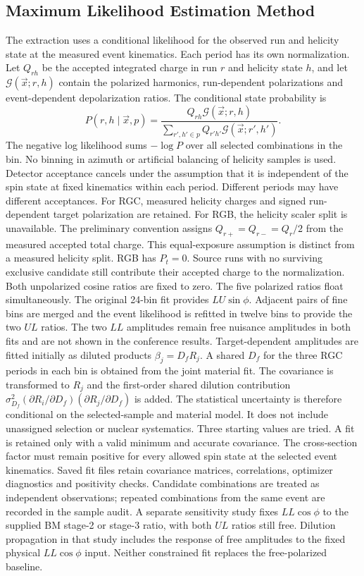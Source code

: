\subsection{Maximum Likelihood Estimation Method}\label{sec:MLE}
The extraction uses a conditional likelihood for the observed run and helicity state at the measured event kinematics. Each period has its own normalization. Let $Q_{rh}$ be the accepted integrated charge in run $r$ and helicity state $h$, and let $\mathcal G(\vec x;r,h)$ contain the polarized harmonics, run-dependent polarizations and event-dependent depolarization ratios. The conditional state probability is
\begin{equation}
 P(r,h\mid\vec x,p)=\frac{Q_{rh}\mathcal G(\vec x;r,h)}{\sum_{r',h'\in p}Q_{r'h'}\mathcal G(\vec x;r',h')}.
\end{equation}
The negative log likelihood sums $-\log P$ over all selected combinations in the bin. No binning in azimuth or artificial balancing of helicity samples is used. Detector acceptance cancels under the assumption that it is independent of the spin state at fixed kinematics within each period. Different periods may have different acceptances.
For RGC, measured helicity charges and signed run-dependent target polarization are retained. For RGB, the helicity scaler split is unavailable. The preliminary convention assigns $Q_{r+}=Q_{r-}=Q_r/2$ from the measured accepted total charge. This equal-exposure assumption is distinct from a measured helicity split. RGB has $P_t=0$. Source runs with no surviving exclusive candidate still contribute their accepted charge to the normalization.
Both unpolarized cosine ratios are fixed to zero. The five polarized ratios float simultaneously. The original 24-bin fit provides $LU\sin\phi$. Adjacent pairs of fine bins are merged and the event likelihood is refitted in twelve bins to provide the two $UL$ ratios. The two $LL$ amplitudes remain free nuisance amplitudes in both fits and are not shown in the conference results.
Target-dependent amplitudes are fitted initially as diluted products $\beta_j=D_f R_j$. A shared $D_f$ for the three RGC periods in each bin is obtained from the joint material fit. The covariance is transformed to $R_j$ and the first-order shared dilution contribution $\sigma_{D_f}^2(\partial R_i/\partial D_f)(\partial R_j/\partial D_f)$ is added. The statistical uncertainty is therefore conditional on the selected-sample and material model. It does not include unassigned selection or nuclear systematics.
Three starting values are tried. A fit is retained only with a valid minimum and accurate covariance. The cross-section factor must remain positive for every allowed spin state at the selected event kinematics. Saved fit files retain covariance matrices, correlations, optimizer diagnostics and positivity checks. Candidate combinations are treated as independent observations; repeated combinations from the same event are recorded in the sample audit.
A separate sensitivity study fixes $LL\cos\phi$ to the supplied BM stage-2 or stage-3 ratio, with both $UL$ ratios still free. Dilution propagation in that study includes the response of free amplitudes to the fixed physical $LL\cos\phi$ input. Neither constrained fit replaces the free-polarized baseline.
